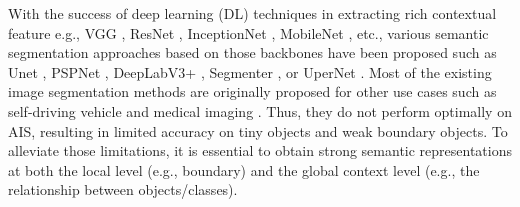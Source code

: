\documentclass[journal]{IEEEtran}
\begin{document}
With the success of deep learning (DL) techniques in extracting rich contextual feature e.g., VGG \cite{simonyan2014very}, ResNet \cite{he2016deep}, InceptionNet \cite{szegedy2016rethinking, szegedy2017inception}, MobileNet \cite{howard2017mobilenets}, etc., various semantic segmentation approaches based on those backbones have been proposed such as Unet \cite{ronneberger2015u}, PSPNet \cite{zhao2017pyramid}, DeepLabV3+ \cite{chen2018encoder}, Segmenter \cite{strudel2021segmenter}, or UperNet \cite{xiao2018unified}. Most of the existing image segmentation methods are originally proposed for other use cases such as self-driving vehicle \cite{minaee2021image} and medical imaging \cite{le2021narrow}. Thus, they do not perform optimally on AIS, resulting in limited accuracy on tiny objects and weak boundary objects. To alleviate those limitations, it is essential to obtain strong semantic representations at both the local level (e.g., boundary) and the global context level (e.g., the relationship between objects/classes).
\end{document}
